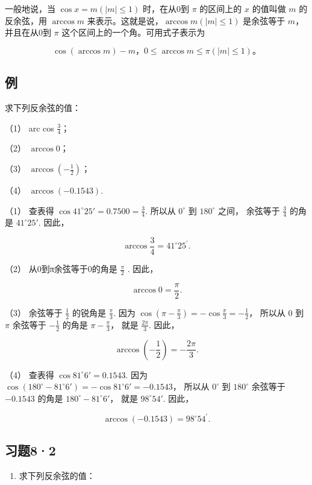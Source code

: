 一般地说，当 \(\cos x = m(|m| \leqslant 1)\) 时，在从0到 \(\pi\)
的区间上的 \(x\) 的值叫做 \(m\) 的反余弦，用 \(\arccos m\)
来表示。这就是说，\(\arccos m(|m| \leqslant 1)\) 是余弦等于
\(m\)，并且在从0到 \(\pi\) 这个区间上的一个角。可用式子表示为

\[
\cos (\arccos m) - m\text{，} 0 \leqslant \arccos m \leqslant \pi (| m | \leqslant 1)\text{。}
\]

\subsection{例}

求下列反余弦的值：

（1） arc cos \(\frac{3}{4}\)；

（2） \(\arccos 0\)；

（3） \(\arccos\left(-\frac{1}{2}\right)\)；

（4） \(\arccos (-0.1543)\).

 （1） 查表得
\(\cos 41^{\circ}25' = 0.7500 = \frac{3}{4}\). 所以从 \(0^{\circ}\) 到
\(180^{\circ}\) 之间， 余弦等于 \(\frac{3}{4}\) 的角是
\(41^{\circ}25'\). 因此，

\[
\arccos \frac {3}{4} = 41 ^{\circ} 25 ^{\prime}.
\]

（2） 从0到π余弦等于0的角是 \(\frac{\pi}{2}\) . 因此，

\[
\arccos 0 = \frac {\pi}{2}.
\]

（3） 余弦等于 \(\frac{1}{2}\) 的锐角是 \(\frac{\pi}{3}\). 因为
\(\cos \left( \pi - \frac{\pi}{3} \right) = -\cos \frac{\pi}{3} = -\frac{1}{2}\)，
所以从 0 到 \(\pi\) 余弦等于 \(-\frac{1}{2}\) 的角是
\(\pi - \frac{\pi}{3}\)， 就是 \(\frac{2\pi}{3}\). 因此，

\[
\arccos \left(- \frac {1}{2}\right) = - \frac {2 \pi}{3}.
\]

（4） 查表得 \(\cos 81^{\circ}6' = 0.1543\). 因为
\(\cos (180^{\circ} - 81^{\circ}6') = -\cos 81^{\circ}6' = -0.1543\)，
所以从 \(0^{\circ}\) 到 \(180^{\circ}\) 余弦等于 \(-0.1543\) 的角是
\(180^{\circ} - 81^{\circ}6'\)， 就是 \(98^{\circ}54'\). 因此，

\[
\operatorname{arccos} (- 0.1543) = 98 ^{\circ} 54 ^{\prime}.
\]

\subsection{习题8·2}

\begin{enumerate}
\item
  求下列反余弦的值：
\end{enumerate}

